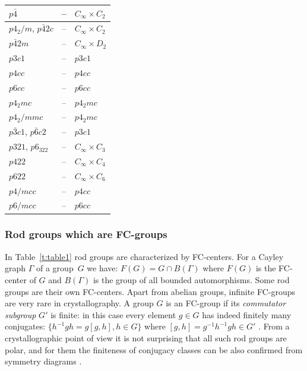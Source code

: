 \documentclass[11pt,a4paper]{article}
\begin{document}
{\begin{table}[H]
\begin{center}
\begin{tabular}{|l|c|l|}
\hline
$p\bar4$ &  -- & $C_{\infty} \times C_2$ \\
\hline
$p4_2/m$, $p\bar42c$ & -- & $C_{\infty} \times C_2$ \\
\hline
$p\bar42m$ & -- & $C_{\infty} \times D_2$ \\
\hline
$p3c1$ & -- & $p3c1$ \\
\hline
$p4cc$ & -- & $p4cc$ \\
\hline
$p6cc$ & -- & $p6cc$ \\
\hline
$p4_2mc$ & -- & $p4_2mc$ \\
\hline
$p4_2/mmc$ & -- & $p4_2mc$ \\
\hline
$p\bar3c1$, $p\bar6c2$ & -- & $p3c1$ \\
\hline
$p321$, $p6_322$ & -- & $C_{\infty} \times C_3$ \\
\hline
$p422$ & -- & $C_{\infty} \times C_4$ \\
\hline
$p622$ & -- & $C_{\infty} \times C_6$ \\
\hline
$p4/mcc$ & -- & $p4cc$ \\
\hline
$p6/mcc$ & -- & $p6cc$ \\
\hline
\end{tabular}
\end{center}
\end{table}
}

\subsubsection{Rod groups which are FC-groups}

In Table~\ref{t:table1} rod groups are characterized by FC-centers. For a Cayley graph $\Gamma$ of a group~$G$ we have: $F(G) = G \cap B(\Gamma)$ where $F(G)$ is the FC-center of $G$ and $B(\Gamma)$ is the group of all bounded automorphisms. Some rod groups are their own FC-centers. Apart from abelian groups, infinite FC-groups are very rare in crystallography. A group $G$ is an FC-group if its \emph{commutator subgroup} $G'$ is finite: in this case every element $g \in G$ has indeed finitely many conjugates: $\{h^{-1}gh = g[g, h], h \in G\}$ where $[g, h]=g^{-1}h^{-1}gh \in G'$ \cite{Tom84}. From a crystallographic point of view it is not surprising that all such rod groups are polar, and for them the finiteness of conjugacy classes can be also confirmed from symmetry diagrams \cite{ITE}. 
\end{document}
